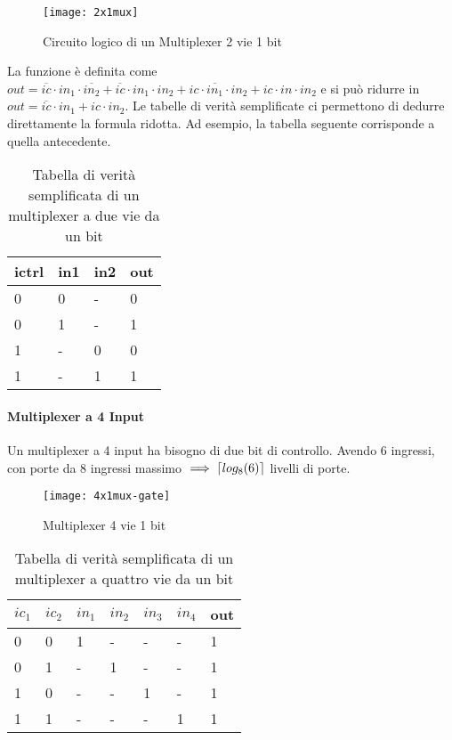 \begin{figure}[H]
	\centering
	\texttt{[image: 2x1mux]}
	\caption{Circuito logico di un Multiplexer 2 vie 1 bit}
\end{figure}



La funzione è definita come $ out = \overbar{ic} \cdot in_1 \cdot \overbar{in_2} + \overbar{ic} \cdot in_1 \cdot in_2 + ic \cdot \overbar{in_1} \cdot in_2 + ic \cdot in \cdot in_2 $ e si può ridurre in $ out = \overbar{ic} \cdot in_1 + ic \cdot in_2 $. Le tabelle di verità semplificate ci permettono di dedurre direttamente la formula ridotta. Ad esempio, la tabella seguente corrisponde a quella antecedente.
\begin{table}[H]
	\centering
	\caption{Tabella di verità semplificata di un multiplexer a due vie da un bit}
	\label{tab:multiplexer2}
	\begin{tabular}{|lll|l|}
		\hline
		ictrl & in1 & in2 & out \\ \hline
		0     & 0   & -   & 0   \\
		0     & 1   & -   & 1   \\ \hline
		1     & -   & 0   & 0   \\
		1     & -   & 1   & 1   \\ \hline
	\end{tabular}
\end{table}

\paragraph{Multiplexer a 4 Input}
Un multiplexer a 4 input ha bisogno di due bit di controllo. Avendo 6 ingressi, con porte da 8 ingressi massimo $ \implies \ceil*{ log_8(6)} $ livelli di porte.


\begin{figure}[H]
	\centering
	\texttt{[image: 4x1mux-gate]}
	\caption{Multiplexer 4 vie 1 bit}
\end{figure}

\begin{table}[H]
	\centering
	\caption{Tabella di verità semplificata di un multiplexer a quattro vie da un bit}
	\label{tab:multiplexer3}
	\begin{tabular}{|llllll|l|}
		\hline
		$ ic_1 $ & $ ic_2 $ & $ in_1 $ & $ in_2 $ & $ in_3 $ & $ in_4 $ & out \\ \hline
		0     & 0     & 1     & -     & -     & -     & 1   \\ \hline
		0     & 1     & -     & 1     & -     & -     & 1   \\ \hline
		1     & 0     & -     & -     & 1     & -     & 1   \\ \hline
		1     & 1     & -     & -     & -     & 1     & 1   \\ \hline
	\end{tabular}
\end{table}


